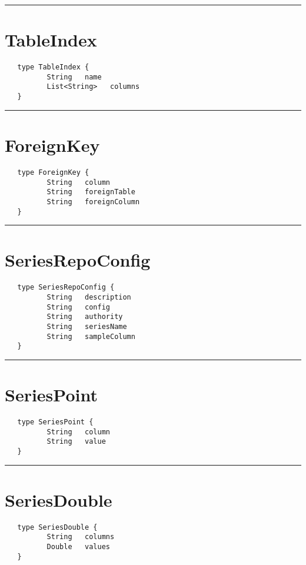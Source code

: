 \rule{12cm}{2pt}
\section{TableIndex}
\label{type:TableIndex}

\begin{verbatim}
   type TableIndex {
          String   name
          List<String>   columns
   }
\end{verbatim}

\rule{12cm}{2pt}
\section{ForeignKey}
\label{type:ForeignKey}

\begin{verbatim}
   type ForeignKey {
          String   column
          String   foreignTable
          String   foreignColumn
   }
\end{verbatim}

\rule{12cm}{2pt}
\section{SeriesRepoConfig}
\label{type:SeriesRepoConfig}

\begin{verbatim}
   type SeriesRepoConfig {
          String   description
          String   config
          String   authority
          String   seriesName
          String   sampleColumn
   }
\end{verbatim}

\rule{12cm}{2pt}
\section{SeriesPoint}
\label{type:SeriesPoint}

\begin{verbatim}
   type SeriesPoint {
          String   column
          String   value
   }
\end{verbatim}

\rule{12cm}{2pt}
\section{SeriesDouble}
\label{type:SeriesDouble}

\begin{verbatim}
   type SeriesDouble {
          String   columns
          Double   values
   }
\end{verbatim}

